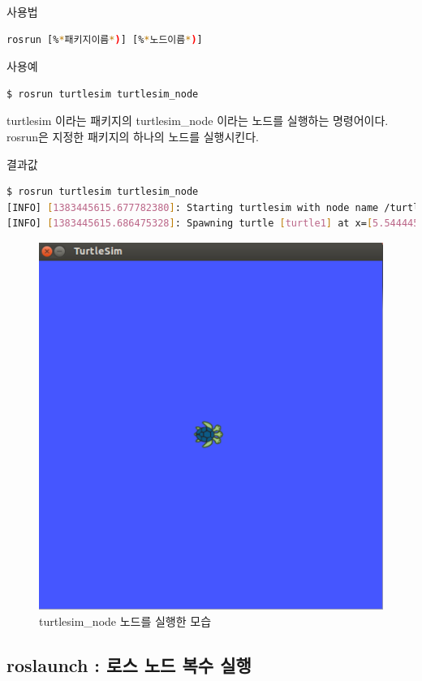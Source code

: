 \setcounter{num}{0}

\vspace{\baselineskip}
\noindent
{}\circled{\thenum} 사용법
\begin{lstlisting}[language=bash]
rosrun [%*패키지이름*)] [%*노드이름*)]
\end{lstlisting}

\noindent
{}\circled{\thenum} 사용예
\begin{lstlisting}[language=bash]
$ rosrun turtlesim turtlesim_node 
\end{lstlisting}

\noindent
turtlesim 이라는 패키지의 turtlesim\_node 이라는 노드를 실행하는 명령어이다. rosrun은 지정한 패키지의 하나의 노드를 실행시킨다. 

\vspace{\baselineskip}
\noindent
{}\circled{\thenum} 결과값
\begin{lstlisting}[language=bash]
$ rosrun turtlesim turtlesim_node 
[INFO] [1383445615.677782380]: Starting turtlesim with node name /turtlesim
[INFO] [1383445615.686475328]: Spawning turtle [turtle1] at x=[5.544445], y=[5.544445], theta=[0.000000]
\end{lstlisting}

\begin{figure}[h]
\centering\includegraphics[width=0.6\columnwidth]{pictures/chapter5/term_rosrun.png}
\caption{turtlesim\_node 노드를 실행한 모습}
\end{figure}

\subsection{roslaunch : 로스 노드 복수 실행}

